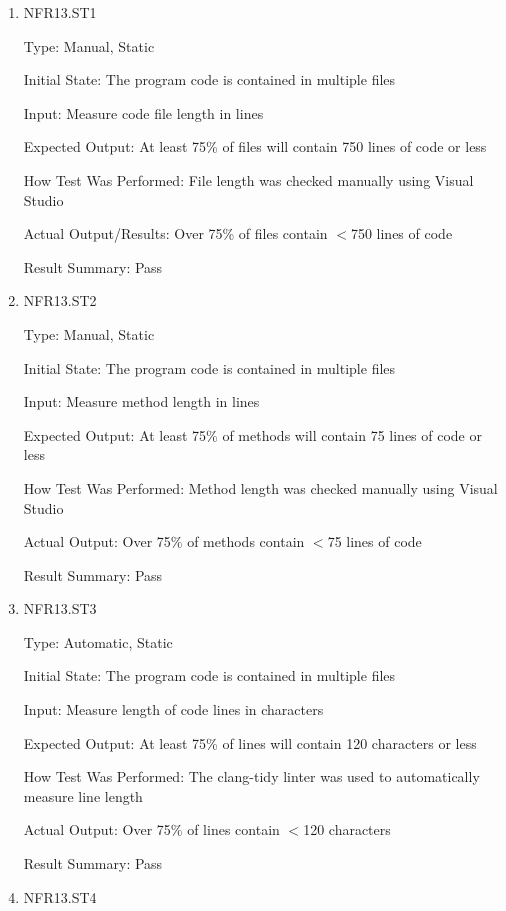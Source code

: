 \documentclass[12pt, titlepage]{article}
\begin{document}
\begin{enumerate}

\item{NFR13.ST1\\}

Type: Manual, Static

Initial State: The program code is contained in multiple files

Input: Measure code file length in lines

Expected Output: At least 75\% of files will contain 750 lines of code or less

How Test Was Performed: File length was checked manually using Visual Studio

Actual Output/Results: Over 75\% of files contain $<$750 lines of code

Result Summary: Pass

\item{NFR13.ST2\\}

Type: Manual, Static

Initial State: The program code is contained in multiple files

Input: Measure method length in lines

Expected Output: At least 75\% of methods will contain 75 lines of code or less

How Test Was Performed: Method length was checked manually using Visual Studio

Actual Output: Over 75\% of methods contain $<$75 lines of code

Result Summary: Pass

\item{NFR13.ST3\\}

Type: Automatic, Static

Initial State: The program code is contained in multiple files

Input: Measure length of code lines in characters

Expected Output: At least 75\% of lines will contain 120 characters or less

How Test Was Performed: The clang-tidy linter was used to automatically measure line length

Actual Output: Over 75\% of lines contain $<$120 characters

Result Summary: Pass

\item{NFR13.ST4\\}


\end{enumerate}
\end{document}
